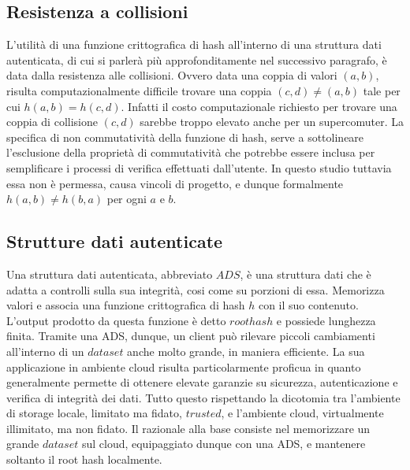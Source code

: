 	\subsection{Resistenza a collisioni}
	

		L'utilità di una funzione crittografica di hash all'interno di una struttura dati autenticata, di cui si parlerà più approfonditamente nel successivo paragrafo, è data dalla resistenza alle collisioni. Ovvero data una coppia di valori $ (a,b) $, risulta computazionalmente difficile trovare una coppia $ (c,d) \ne (a,b) $ tale per cui  $ h(a,b) = h(c,d) $. Infatti il costo computazionale richiesto per trovare una coppia di collisione $ (c,d) $ sarebbe troppo elevato anche per un supercomuter.
		La specifica di non commutatività della funzione di hash, serve a sottolineare l'esclusione della proprietà di commutatività che potrebbe essere inclusa per semplificare i processi di verifica effettuati dall'utente.
		In questo studio tuttavia essa non è permessa, causa vincoli di progetto, e dunque formalmente $ h(a,b) \ne h(b,a) $ per ogni $ a $ e $ b $.

	\subsection{Strutture dati autenticate}


		Una struttura dati autenticata, abbreviato $ ADS $, è una struttura dati che è adatta a controlli sulla sua integrità, cosi come su porzioni di essa. Memorizza valori e associa una funzione crittografica di hash $ h $ con il suo contenuto. L'output prodotto da questa funzione è detto $root hash$ e possiede lunghezza finita. Tramite una ADS, dunque, un client può rilevare piccoli cambiamenti all'interno di un $ dataset $ anche molto grande, in maniera efficiente.
		La sua applicazione in ambiente cloud risulta particolarmente proficua in quanto generalmente permette di ottenere elevate garanzie su sicurezza, autenticazione e verifica di integrità dei dati. Tutto questo rispettando la dicotomia tra l'ambiente di storage locale, limitato ma fidato, $ trusted $, e l'ambiente cloud, virtualmente illimitato, ma non fidato. Il razionale alla base consiste nel memorizzare un grande $ dataset$ sul cloud, equipaggiato dunque con una ADS, e mantenere soltanto il root hash localmente.
		
